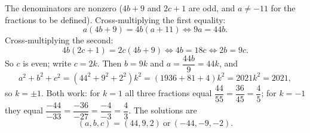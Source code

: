 The denominators are nonzero ($4b+9$ and $2c+1$ are odd, and $a\ne-11$ for the fractions to be defined). Cross-multiplying the first equality:
\[a(4b+9)=4b(a+11)\iff9a=44b.\]
Cross-multiplying the second:
\[4b(2c+1)=2c(4b+9)\iff4b=18c\iff2b=9c.\]
So $c$ is even; write $c=2k$. Then $b=9k$ and $a=\dfrac{44b}{9}=44k$, and
\[a^2+b^2+c^2=\left(44^2+9^2+2^2\right)k^2=(1936+81+4)k^2=2021k^2=2021,\]
so $k=\pm1$. Both work: for $k=1$ all three fractions equal $\dfrac{44}{55}=\dfrac{36}{45}=\dfrac45$; for $k=-1$ they equal $\dfrac{-44}{-33}=\dfrac{-36}{-27}=\dfrac{-4}{-3}=\dfrac43$. The solutions are
\[\boxed{(a,b,c)=(44,9,2)\ \text{or}\ (-44,-9,-2)}.\]
